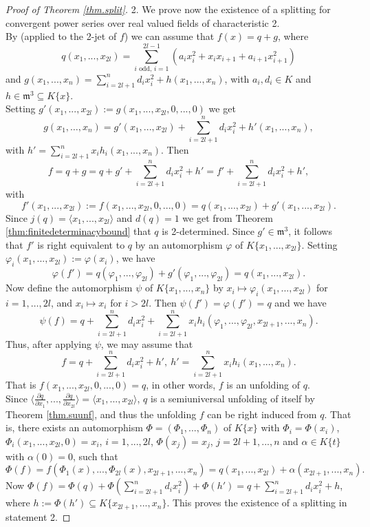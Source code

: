 \documentclass[11pt]{article}
\newcommand{\fm}{\mathfrak{m}}
\begin{document}
\begin{proof}[Proof of Theorem \ref{thm.split}]
2.  We prove now the existence of a splitting for convergent power series over real valued fields of characteristic 2. \\
By \cite[Theorem 3.1]{GP25}  (applied to the 2-jet of $f$) we can assume that
  $ f(x)= q + g$, where
$$ q(x_1,...,x_{2l}) = \sum_{i \text{ odd, } i=1}^{2l-1}(a_i x_i^2 +  x_ix_{i+1}+ a_{i+1} x_{i+1}^2)$$
and $g(x_1,...,x_n)=\sum_{i=2l+1}^{n}d_i x_i^2 +h(x_1,...,x_n)$,
with $a_i, d_i \in K$ and $h\in \fm^3 \subseteq K\{x\}$.\\
Setting $g'(x_1,...,x_{2l}):= g(x_1,...,x_{2l},0,...,0)$ we get
 $$g(x_{1},\dots,x_n)=g'(x_1,...,x_{2l}) + \sum_{i=2l+1}^{n}d_i x_i^2 +h'(x_1,...,x_n),$$
  with 
 $h'= \sum_{i=2l+1}^n x_ih_i(x_1,...,x_n)$. Then 
 $$f = q+g = 
 q+ g'+ \sum_{i=2l+1}^{n}d_i x_i^2 + h'=f'+  \sum_{i=2l+1}^{n}d_i x_i^2+ h',$$ 
 with
  $$f'(x_1,...,x_{2l}):=  f(x_1,...,x_{2l},0,...,0) =q(x_1,...,x_{2l}) + g'(x_1,...,x_{2l}).$$
 Since $j(q) = \langle x_1,...,x_{2l}\rangle$ and $d(q)=1$ we get from Theorem \ref{thm:finitedeterminacybound} that $q$ is 2-determined.
Since $g' \in \fm^3$, it follows that $f'$
 is right equivalent to $q$ by an automorphism $\varphi$ of 
 $K\{ x_1,...,x_{2l}\}$. Setting $\varphi_i(x_1,...,x_{2l}) := \varphi(x_i)$,
we have
 $$\varphi(f') = q(\varphi_1,...,\varphi_{2l})+g'(\varphi_1,...,\varphi_{2l}) = q(x_1,...,x_{2l}).$$
 Now define the automorphism  $\psi$ of $K\{ x_1,...,x_n\}$ by $x_i\mapsto \varphi_i(x_1,...,x_{2l})$ for
  $i=1,\dots,{2l}$, and \mbox{$x_i\mapsto x_i$} for $i>{2l}$. Then 
  $\psi(f') = \varphi(f') =q$ and
 we have
  $$\psi(f) = 
  q+\sum_{i=2l+1}^{n}d_i x_i^2 +\sum_{i={2l}+1}^n x_ih_i(\varphi_1,...,\varphi_{2l},x_{{2l}+1},...,x_n). $$
 Thus, after applying $\psi$, we may assume that 
 $$f= q +\sum_{i=2l+1}^{n}d_i x_i^2+ h', \ 
 h'= \sum_{i={2l}+1}^n x_ih_i(x_1,...,x_n).$$
  That is $f(x_1,...,x_{2l},0,...,0) = q$, in other words, $f$ is an unfolding of $q$.\\
  Since $\langle \frac{\partial q}{\partial x_1},..., \frac{\partial q}{\partial x_{2l}}\rangle =\langle x_1,...,x_{2l}\rangle$, $q$ is a semiuniversal unfolding of itself by Theorem \ref{thm.suunf}, and thus
the unfolding $f$ can be right induced from $q$.
That is,  there exists an automorphism  $\Phi =(\Phi_1,...,\Phi_n)$ of $K\{x\}$  with $\Phi_i=\Phi(x_i)$,
 $\Phi_i(x_1,...,x_{2l},0) = x_i$, $i=1,...,2l$,
  $\Phi(x_j) = x_j$, $j=2l+1,...,n$  
  and $\alpha \in K\{t\}$ with  $\alpha(0)=0$,
such that 
$$\Phi(f)=f(\Phi_1(x),...,\Phi_{2l}(x),x_{2l+1},...,x_n) = 
q(x_1,...,x_{2l}) +\alpha(x_{2l+1},...,x_n).$$ 
Now $\Phi(f)= \Phi(q)+\Phi(\sum_{i=2l+1}^{n}d_i x_i^2)+\Phi(h')
=q  +\sum_{i=2l+1}^{n}d_i x_i^2 + h$, where $h:=\Phi(h') \subseteq K\{x_{2l+1},...,x_n\}$. This proves the existence of a splitting  in statement 2.
\end{proof}
\end{document}
